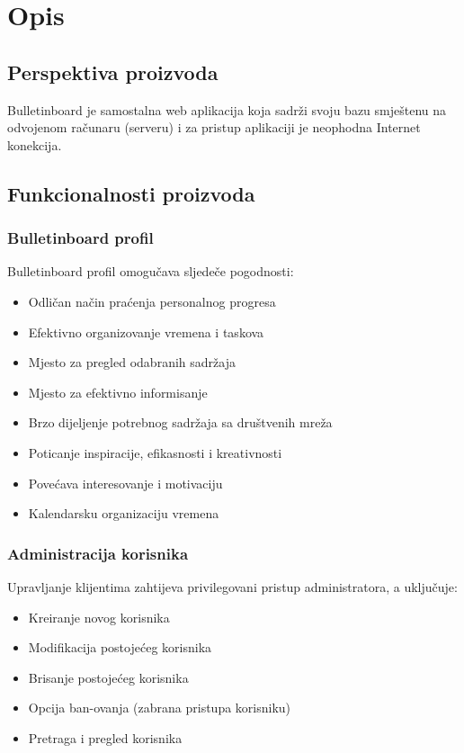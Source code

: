 \section{Opis}
\subsection{Perspektiva proizvoda}
Bulletinboard je samostalna web aplikacija koja sadrži svoju bazu smještenu na odvojenom računaru (serveru) i za pristup aplikaciji je neophodna Internet konekcija.
\subsection{Funkcionalnosti proizvoda}
\subsubsection{Bulletinboard profil}
Bulletinboard profil omogučava sljedeče pogodnosti:
\begin{itemize}
    \item Odličan način praćenja personalnog progresa
    \item Efektivno organizovanje vremena i taskova
    \item Mjesto za pregled odabranih sadržaja
    \item Mjesto za efektivno informisanje
    \item Brzo dijeljenje potrebnog sadržaja sa društvenih mreža
    \item Poticanje inspiracije, efikasnosti i kreativnosti
    \item Povećava interesovanje i motivaciju
    \item Kalendarsku organizaciju vremena
\end{itemize}

\subsubsection{Administracija korisnika}
Upravljanje klijentima zahtijeva privilegovani pristup administratora, a uključuje:
\begin{itemize}
    \item Kreiranje novog korisnika
    \item Modifikacija postojećeg korisnika
    \item Brisanje postojećeg korisnika
    \item Opcija ban-ovanja (zabrana pristupa korisniku)
    \item Pretraga i pregled korisnika
\end{itemize}


